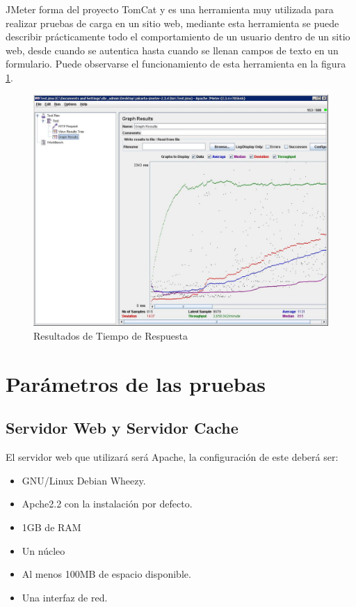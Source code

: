 JMeter forma del proyecto TomCat y es una herramienta muy utilizada para realizar pruebas de carga en un sitio web, mediante esta herramienta se puede describir prácticamente todo el comportamiento de un usuario dentro de un sitio web, desde cuando se autentica hasta cuando se llenan campos de texto en un formulario. Puede observarse el funcionamiento de esta herramienta en la figura \ref{jmeter}.

\begin{figure}[h]
  \centering
    \includegraphics[scale=0.4]{gfx/jmeter}
  \caption{Resultados de Tiempo de Respuesta}
  \label{jmeter}
\end{figure}




\section{Parámetros de las pruebas}

\subsection{Servidor Web y Servidor Cache}
El servidor web que utilizará será Apache, la configuración de este deberá ser:

\begin{itemize}
\item GNU/Linux Debian Wheezy.
\item Apche2.2 con la instalación por defecto.
\item 1GB de RAM 
\item Un núcleo
\item Al menos 100MB de espacio disponible.
\item Una interfaz de red.
\end{itemize}

